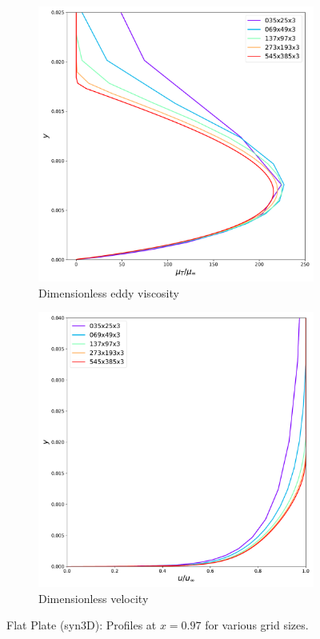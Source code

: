 \begin{figure}[ht!]
\centering
\begin{subfigure}{.45\textwidth}
  \centering
  \includegraphics[width=1.0\textwidth]{figs/flat/rev_grid.pdf}
  \caption{Dimensionless eddy viscosity}
\end{subfigure}%
\begin{subfigure}{.45\textwidth}
  \centering
  \includegraphics[width=1.0\textwidth]{figs/flat/u097_grid.pdf}
  \caption{Dimensionless velocity}
\end{subfigure}
\caption{Flat Plate (syn3D): Profiles at $x=0.97$ for various grid sizes.}
\label{fig:synflatprofilestudy}
\end{figure}

